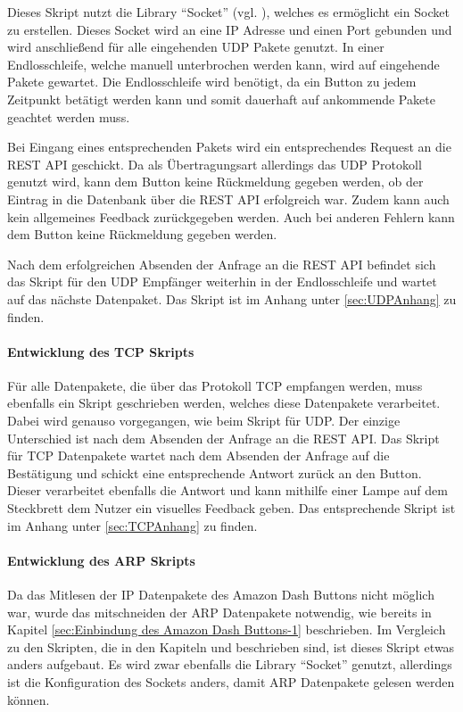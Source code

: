 Dieses Skript nutzt die Library ``Socket'' (vgl. \cite{.20.02.2017}), welches es ermöglicht ein Socket zu erstellen. Dieses Socket wird an eine \ac{IP} Adresse und einen Port gebunden und wird anschließend für alle eingehenden \ac{UDP} Pakete genutzt. In einer Endlosschleife, welche manuell unterbrochen werden kann, wird auf eingehende Pakete gewartet. Die Endlosschleife wird benötigt, da ein Button zu jedem Zeitpunkt betätigt werden kann und somit dauerhaft auf ankommende Pakete geachtet werden muss. 

Bei Eingang eines entsprechenden Pakets wird ein entsprechendes Request an die \ac{REST} \ac{API} geschickt. Da als Übertragungsart allerdings das \ac{UDP} Protokoll genutzt wird, kann dem Button keine Rückmeldung gegeben werden, ob der Eintrag in die Datenbank über die \ac{REST} \ac{API} erfolgreich war. Zudem kann auch kein allgemeines Feedback zurückgegeben werden. Auch bei anderen Fehlern kann dem Button keine Rückmeldung gegeben werden. 

Nach dem erfolgreichen Absenden der Anfrage an die \ac{REST} \ac{API} befindet sich das Skript für den \ac{UDP} Empfänger weiterhin in der Endlosschleife und wartet auf das nächste Datenpaket. 
Das Skript ist im Anhang unter \ref{sec:UDPAnhang} zu finden. 

\paragraph{Entwicklung des \ac{TCP} Skripts}$\;$ \\  
\label{sec:Entwicklung des TCP Skripts-1} 
Für alle Datenpakete, die über das Protokoll \ac{TCP} empfangen werden, muss ebenfalls ein Skript geschrieben werden, welches diese Datenpakete verarbeitet. Dabei wird genauso vorgegangen, wie beim Skript für \ac{UDP}. Der einzige Unterschied ist nach dem Absenden der Anfrage an die \ac{REST} \ac{API}. Das Skript für \ac{TCP} Datenpakete wartet nach dem Absenden der Anfrage auf die Bestätigung und schickt eine entsprechende Antwort zurück an den Button. Dieser verarbeitet ebenfalls die Antwort und kann mithilfe einer Lampe auf dem Steckbrett dem Nutzer ein visuelles Feedback geben. 
Das entsprechende Skript ist im Anhang unter \ref{sec:TCPAnhang} zu finden.

\paragraph{Entwicklung des \ac{ARP} Skripts}$\;$ \\  
\label{sec:Entwicklung des ARP Skripts-1} 
Da das Mitlesen der \ac{IP} Datenpakete des Amazon Dash Buttons nicht möglich war, wurde das mitschneiden der \ac{ARP} Datenpakete notwendig, wie bereits in Kapitel \ref{sec:Einbindung des Amazon Dash Buttons-1} beschrieben. 
Im Vergleich zu den Skripten, die in den Kapiteln  und  beschrieben sind, ist dieses Skript etwas anders aufgebaut. Es wird zwar ebenfalls die Library ``Socket'' genutzt, allerdings ist die Konfiguration des Sockets anders, damit \ac{ARP} Datenpakete gelesen werden können. 


